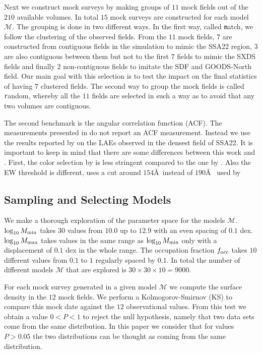 \documentclass[usenatbib]{mn2e}
\begin{document}
Next we construct mock surveys by making groups of $11$ mock fields
out of the $210$ available volumes. In total $15$ mock surveys are
constructed for each model $\mathcal{M}$. The grouping is done in two
different ways. In the first way, called {\texttt match}, we follow
the clustering of the observed fields. From the $11$ mock fields, $7$
are constructed from contiguous fields in the simulation to mimic the
SSA22 region, $3$ are also contiguous between them but not to the first
$7$ fields to mimic the SXDS fields and finally $2$ non-contiguous
fields to imitate the SDF and GOODS-North field. Our main goal with
this selection is to test the impact on the final statistics of having
$7$ clustered fields. The second way to group the mock fields is called {\texttt
  random}, whereby all the $11$ fields are selected in such a way as
to avoid that any two volumes are contiguous.



The second benchmark is the angular correlation function (ACF). The
measurements presented in \citep{Yamada2012} do not report an ACF
measurement. Instead we use the results reported by
\citep{Hayashino2004} on the LAEs observed in the densest field of
SSA22. It is important to keep in mind that there are some differences
between this work and \citep{Yamada2012}. First, the color selection by
\cite{Yamada2012} is less stringent compared to the one by
\cite{Hayashino2004}. Also the EW threshold is different,
\cite{Hayashino2004} uses a cut around $154$\AA \ instead of $190$\AA
\ used by \citep{Yamada2012}


\subsection{Sampling and Selecting Models}

We make a thorough exploration of the parameter space for the models
${\mathcal M}$. $\log_{10} M_{\rm min}$ takes $30$ values from $10.0$ up
to $12.9$ with an even spacing of $0.1$ dex. $\log_{10} M_{\rm max}$
takes values in the same range as $\log_{10}M_{\rm min}$ only with a
displacement of $0.1$ dex in the whole range. The occupation fraction
$f_{\rm occ}$ takes $10$ different values from $0.1$ to $1$ regularly
spaced by $0.1$. In total the number of different models ${\mathcal
  M}$ that are explored is $30 \times 30 \times 10 = 9000$.

For each mock survey generated in a given model ${\mathcal M}$ we
compute the surface density in the $12$ mock fields. We perform a
Kolmogorov-Smirnov (KS) to compare this mock date against the $12$
observational values. From this test we obtain a value $0<P<1$ to
reject the null hypothesis, namely that two data sets come from the
same distribution. In this paper we consider that for values $P>0.05$
the two distributions can be thought as coming from the same
distribution.
\end{document}
